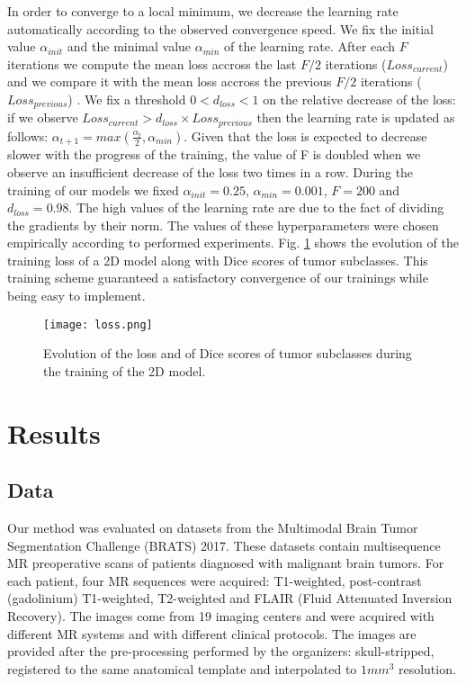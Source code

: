 \documentclass[preprint,12pt]{elsarticle}
\begin{document}
In order to converge to a local minimum, we decrease the learning rate automatically according to the observed convergence speed. We fix the initial value $\alpha_{init}$ and the minimal value $\alpha_{min}$ of the learning rate. After each $F$ iterations we compute the mean loss accross the last $F/2$ iterations ($Loss_{current}$) and we compare it with the mean loss accross the previous $F/2$ iterations ($Loss_{previous}$) . We fix a threshold $0 < d_{loss} <1 $ on the relative decrease of the loss: if we observe $Loss_{current}> d_{loss} \times Loss_{previous} $ then the learning rate is updated as follows: $\alpha_{t+1}= max(\frac{\alpha_t}{2},\alpha_{min})$. Given that the loss is expected to decrease slower with the progress of the training, the value of F is doubled when we observe an insufficient decrease of the loss two times in a row. During the training of our models we fixed $\alpha_{init}=0.25$,  $\alpha_{min}=0.001$, $F=200$ and $d_{loss}=0.98$. The high values of the learning rate are due to the fact of dividing the gradients by their norm. The values of these hyperparameters were chosen empirically according to performed experiments. Fig. \ref{fig_loss} shows the evolution of the training loss of a 2D model along with Dice scores of tumor subclasses. This training scheme guaranteed a satisfactory convergence of our trainings while being easy to implement.

\begin{figure}[!ht]
\centering
\texttt{[image: loss.png]}
\caption{Evolution of the loss and of Dice scores of tumor subclasses during the training of the 2D model.}
\label{fig_loss}
\end{figure}




\section{Results}
\label{section_results}
\subsection{Data}


Our method was evaluated on datasets from the Multimodal Brain Tumor Segmentation Challenge (BRATS) 2017.  These datasets contain multisequence MR preoperative scans of patients diagnosed with malignant brain tumors. For each patient, four MR sequences were acquired: T1-weighted, post-contrast (gadolinium) T1-weighted, T2-weighted and FLAIR (Fluid Attenuated Inversion Recovery). The images come from 19 imaging centers and were acquired with different MR systems and with different clinical protocols. The images are provided after the pre-processing performed by the organizers: skull-stripped, registered to the same anatomical template and interpolated to $1mm^3$ resolution. 
\end{document}
